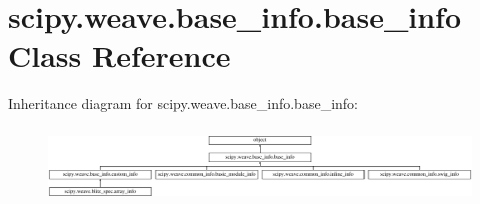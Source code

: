 \hypertarget{classscipy_1_1weave_1_1base__info_1_1base__info}{}\section{scipy.\+weave.\+base\+\_\+info.\+base\+\_\+info Class Reference}
\label{classscipy_1_1weave_1_1base__info_1_1base__info}
Inheritance diagram for scipy.\+weave.\+base\+\_\+info.\+base\+\_\+info\+:\begin{figure}[H]
\begin{center}
\leavevmode
\includegraphics[height=2.014389cm]{classscipy_1_1weave_1_1base__info_1_1base__info}
\end{center}
\end{figure}

